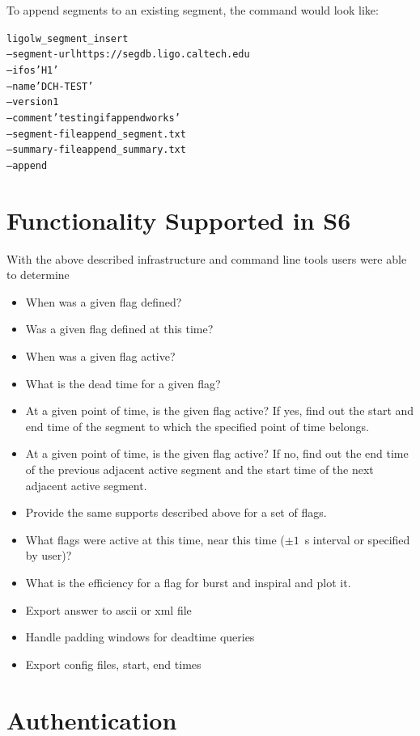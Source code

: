 To append segments to an existing segment, the command would look like:

\begin{alltt}
ligolw\_segment\_insert 
  --segment-url https://segdb.ligo.caltech.edu
  --ifos 'H1'
  --name 'DCH-TEST'
  --version 1
  --comment 'testing if append works'
  --segment-file append\_segment.txt
  --summary-file append\_summary.txt
  --append
\end{alltt}

\section{Functionality Supported in S6}
With the above described infrastructure and command line tools
users were able to determine

\begin{itemize}
\item When was a given flag defined?
\item Was a given flag defined at this time?
\item When was a given flag active?
\item What is the dead time for a given flag? 
\item At a given point of time, is the given flag active? If yes, find
out the start and end time of the segment to which the specified point
of time belongs.
\item At a given point of time, is the given flag active? If no, find
out the end time of the previous adjacent active segment and the start
time of the next adjacent active segment.
\item Provide the same supports described above for a set of flags.
\item What flags were active at this time, near this time ($\pm 1$~s
interval or specified by user)?
\item What is the efficiency for a flag for burst and inspiral and
plot it.
\item Export answer to ascii or xml file
\item Handle padding windows for deadtime queries
\item Export config files, start, end times
\end{itemize}


\section{Authentication}

